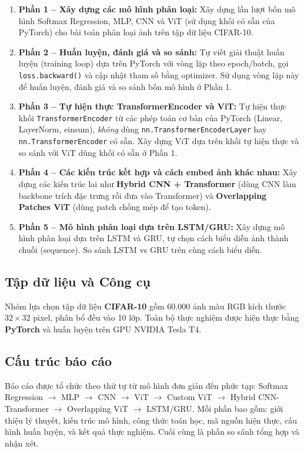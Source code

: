 \documentclass[a4paper]{article}
\newcommand{\code}[1]{\texttt{\textcolor{blue!80!black}{#1}}}
\theoremstyle{definition}
\begin{document}
\begin{enumerate}
	\item \textbf{Phần 1 -- Xây dựng các mô hình phân loại:} Xây dựng lần lượt bốn mô hình Softmax Regression, MLP, CNN và ViT (sử dụng khối có sẵn của PyTorch) cho bài toán phân loại ảnh trên tập dữ liệu CIFAR-10.

	\item \textbf{Phần 2 -- Huấn luyện, đánh giá và so sánh:} Tự viết giải thuật huấn luyện (training loop) dựa trên PyTorch với vòng lặp theo epoch/batch, gọi \code{loss.backward()} và cập nhật tham số bằng optimizer. Sử dụng vòng lặp này để huấn luyện, đánh giá và so sánh bốn mô hình ở Phần 1.

	\item \textbf{Phần 3 -- Tự hiện thực TransformerEncoder và ViT:} Tự hiện thực khối \code{TransformerEncoder} từ các phép toán cơ bản của PyTorch (Linear, LayerNorm, einsum), \textit{không} dùng \code{nn.TransformerEncoderLayer} hay \code{nn.TransformerEncoder} có sẵn. Xây dựng ViT dựa trên khối tự hiện thực và so sánh với ViT dùng khối có sẵn ở Phần 1.

	\item \textbf{Phần 4 -- Các kiến trúc kết hợp và cách embed ảnh khác nhau:} Xây dựng các kiến trúc lai như \textbf{Hybrid CNN + Transformer} (dùng CNN làm backbone trích đặc trưng rồi đưa vào Transformer) và \textbf{Overlapping Patches ViT} (dùng patch chồng mép để tạo token).

	\item \textbf{Phần 5 -- Mô hình phân loại dựa trên LSTM/GRU:} Xây dựng mô hình phân loại dựa trên LSTM và GRU, tự chọn cách biểu diễn ảnh thành chuỗi (sequence). So sánh LSTM vs GRU trên cùng cách biểu diễn.
\end{enumerate}

\subsection{Tập dữ liệu và Công cụ}
Nhóm lựa chọn tập dữ liệu \textbf{CIFAR-10} gồm 60.000 ảnh màu RGB kích thước $32 \times 32$ pixel, phân bổ đều vào 10 lớp. Toàn bộ thực nghiệm được hiện thực bằng \textbf{PyTorch} và huấn luyện trên GPU NVIDIA Tesla T4.

\subsection{Cấu trúc báo cáo}
Báo cáo được tổ chức theo thứ tự từ mô hình đơn giản đến phức tạp: Softmax Regression $\to$ MLP $\to$ CNN $\to$ ViT $\to$ Custom ViT $\to$ Hybrid CNN-Transformer $\to$ Overlapping ViT $\to$ LSTM/GRU. Mỗi phần bao gồm: giới thiệu lý thuyết, kiến trúc mô hình, công thức toán học, mã nguồn hiện thực, cấu hình huấn luyện, và kết quả thực nghiệm. Cuối cùng là phần so sánh tổng hợp và nhận xét.
\end{document}
